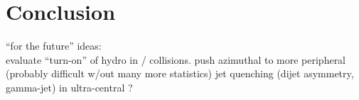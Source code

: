 \chapter{Conclusion}
\label{ch:conclusion}

``for the future'' ideas:\\
evaluate ``turn-on'' of hydro in \pPb / \pp collisions.
push azimuthal to more peripheral (probably difficult w/out many more statistics)
jet quenching (dijet asymmetry, gamma-jet) in ultra-central \pPb?
